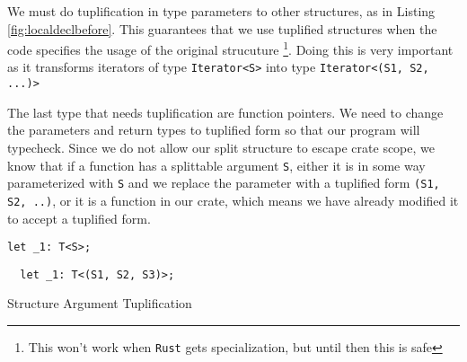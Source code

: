 \documentclass[prodmode,acmtecs]{acmsmall} %
\newcommand{\rustname}{{\texttt{Rust}}}
\def \rust {\rustname{}\xspace}
\begin{document}
We must do tuplification in type parameters to other structures,
as in Listing \ref{fig:localdeclbefore}.
This guarantees that we use tuplified structures
when the code specifies the usage of the original strucuture
\footnote{This won't work when \rust gets specialization, 
but until then this is safe}.
Doing this is very important as it transforms iterators
of type \texttt{Iterator<S>} into type \texttt{Iterator<(S1, S2, ...)>}

The last type that needs tuplification are function pointers. We 
need to change the parameters and return types to tuplified form
so that our program will typecheck. Since we do not allow our split structure
to escape crate scope, we know that if a function has a splittable
argument \texttt{S}, either it is in some way parameterized with
\texttt{S} and we replace the parameter with a tuplified form
\texttt{(S1, S2, ..)}, or it is a function in our crate, which
means we have already modified it to accept a tuplified form.

\begin{listing*}[p]
  \begin{minipage}[t]{0.5\linewidth}
\begin{verbatim}
let _1: T<S>;
\end{verbatim}
  \end{minipage}
  \begin{minipage}[t]{0.5\linewidth}
\begin{verbatim}
  let _1: T<(S1, S2, S3)>;
\end{verbatim}
  \end{minipage}
  \caption{Structure Argument Tuplification}
  \label{fig:localdeclbefore}
\end{listing*}
\end{document}
